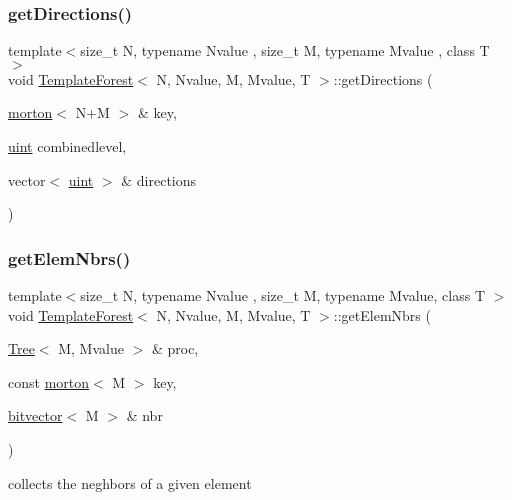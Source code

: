 \subsubsection{\texorpdfstring{get\+Directions()}{getDirections()}}
{\footnotesize\ttfamily template$<$size\+\_\+t N, typename Nvalue , size\+\_\+t M, typename Mvalue , class T $>$ \\
void \mbox{\hyperlink{classTemplateForest}{Template\+Forest}}$<$ N, Nvalue, M, Mvalue, T $>$\+::get\+Directions (\begin{DoxyParamCaption}\item[{\mbox{\hyperlink{definitions_8h_af8682350bd8bb38ee9023f7a0a310add}{morton}}$<$ N+M $>$ \&}]{key,  }\item[{\mbox{\hyperlink{definitions_8h_a69aa29b598b851b0640aa225a9e5d61d}{uint}}}]{combinedlevel,  }\item[{vector$<$ \mbox{\hyperlink{definitions_8h_a69aa29b598b851b0640aa225a9e5d61d}{uint}} $>$ \&}]{directions }\end{DoxyParamCaption})}

\mbox{\label{classTemplateForest_af8b358bae287aa4d0536988f56c6e07f}} 
\subsubsection{\texorpdfstring{get\+Elem\+Nbrs()}{getElemNbrs()}}
{\footnotesize\ttfamily template$<$size\+\_\+t N, typename Nvalue , size\+\_\+t M, typename Mvalue, class T $>$ \\
void \mbox{\hyperlink{classTemplateForest}{Template\+Forest}}$<$ N, Nvalue, M, Mvalue, T $>$\+::get\+Elem\+Nbrs (\begin{DoxyParamCaption}\item[{\mbox{\hyperlink{classTree}{Tree}}$<$ M, Mvalue $>$ \&}]{proc,  }\item[{const \mbox{\hyperlink{definitions_8h_af8682350bd8bb38ee9023f7a0a310add}{morton}}$<$ M $>$}]{key,  }\item[{\mbox{\hyperlink{definitions_8h_a55821d7929f3f16aaf1466129c209492}{bitvector}}$<$ M $>$ \&}]{nbr }\end{DoxyParamCaption})}

collects the neghbors of a given element \mbox{\label{classTemplateForest_abbc3d31a30cf34aa9e511c98ac677627}} 
